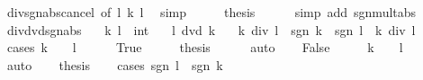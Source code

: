 \begin{isabellebody}
\ div{\isacharunderscore}{\kern0pt}sgn{\isacharunderscore}{\kern0pt}abs{\isacharunderscore}{\kern0pt}cancel\ {\isacharbrackleft}{\kern0pt}of\ l\ k\ l{\isacharbrackright}{\kern0pt}\ \isamarkupfalse%
\ simp\isanewline
\ \ \isamarkupfalse%
\ \isamarkupfalse%
\ {\isacharquery}{\kern0pt}thesis\isanewline
\ \ \ \ \isamarkupfalse%
\ {\isacharparenleft}{\kern0pt}simp\ add{\isacharcolon}{\kern0pt}\ sgn{\isacharunderscore}{\kern0pt}mult{\isacharunderscore}{\kern0pt}abs{\isacharparenright}{\kern0pt}\isanewline
{}\isamarkupfalse%
%
\endisatagproof
{\isafoldproof}%
%
\isadelimproof
\isanewline
%
\endisadelimproof
\isanewline
{}\isamarkupfalse%
\ div{\isacharunderscore}{\kern0pt}dvd{\isacharunderscore}{\kern0pt}sgn{\isacharunderscore}{\kern0pt}abs{\isacharcolon}{\kern0pt}\isanewline
\ \ \ k\ l\ {\isacharcolon}{\kern0pt}{\isacharcolon}{\kern0pt}\ int\isanewline
\ \ \ {\isachardoublequoteopen}l\ dvd\ k{\isachardoublequoteclose}\isanewline
\ \ \ {\isachardoublequoteopen}k\ div\ l\ {\isacharequal}{\kern0pt}\ {\isacharparenleft}{\kern0pt}sgn\ k\ {\isacharasterisk}{\kern0pt}\ sgn\ l{\isacharparenright}{\kern0pt}\ {\isacharasterisk}{\kern0pt}\ {\isacharparenleft}{\kern0pt}{\isasymbar}k{\isasymbar}\ div\ {\isasymbar}l{\isasymbar}{\isacharparenright}{\kern0pt}{\isachardoublequoteclose}\isanewline
%
\isadelimproof
%
\endisadelimproof
%
\isatagproof
{}\isamarkupfalse%
\ {\isacharparenleft}{\kern0pt}cases\ {\isachardoublequoteopen}k\ {\isacharequal}{\kern0pt}\ {}\ {\isasymor}\ l\ {\isacharequal}{\kern0pt}\ {}{\isachardoublequoteclose}{\isacharparenright}{\kern0pt}\isanewline
\ \ \isamarkupfalse%
\ True\isanewline
\ \ \isamarkupfalse%
\ \isamarkupfalse%
\ {\isacharquery}{\kern0pt}thesis\isanewline
\ \ \ \ \isamarkupfalse%
\ auto\isanewline
{}\isamarkupfalse%
\isanewline
\ \ \isamarkupfalse%
\ False\isanewline
\ \ \isamarkupfalse%
\ \isamarkupfalse%
\ {\isachardoublequoteopen}k\ {\isasymnoteq}\ {}{\isachardoublequoteclose}\ \ {\isachardoublequoteopen}l\ {\isasymnoteq}\ {}{\isachardoublequoteclose}\isanewline
\ \ \ \ \isamarkupfalse%
\ auto\isanewline
\ \ \isamarkupfalse%
\ {\isacharquery}{\kern0pt}thesis\isanewline
\ \ \isamarkupfalse%
\ {\isacharparenleft}{\kern0pt}cases\ {\isachardoublequoteopen}sgn\ l\ {\isacharequal}{\kern0pt}\ sgn\ k{\isachardoublequoteclose}{\isacharparenright}{\kern0pt}\isanewline

\end{isabellebody}
